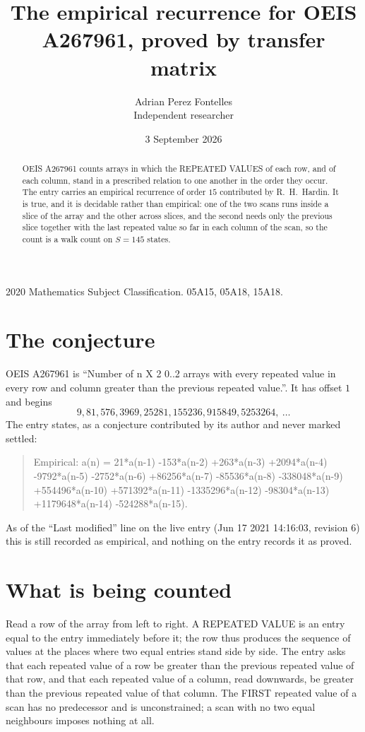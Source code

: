 \documentclass[11pt,a4paper]{article}
\title{The empirical recurrence for OEIS A267961, proved by transfer matrix}
\author{Adrian Perez Fontelles\\ \small Independent researcher}
\date{3 September 2026}
\theoremstyle{plain}
\theoremstyle{definition}
\begin{document}
\maketitle

\begin{abstract}
OEIS A267961 counts arrays in which the REPEATED VALUES of each row, and of each column, stand in a
prescribed relation to one another in the order they occur. The entry carries an empirical
recurrence of order $15$ contributed by R.~H.~Hardin. It is true, and it is decidable
rather than empirical: one of the two scans runs inside a slice of the array and the other
across slices, and the second needs only the previous slice together with the last repeated
value so far in each column of the scan, so the count is a walk count on $S=145$ states.
\end{abstract}

\noindent\small 2020 Mathematics Subject Classification. 05A15, 05A18, 15A18.\normalsize

\section{The conjecture}

OEIS A267961 is ``Number of n X 2 0..2 arrays with every repeated value in every row and column greater than the previous repeated value.''. It has offset $1$ and begins
\[
9, 81, 576, 3969, 25281, 155236, 915849, 5253264,\ \dots
\]
The entry states, as a conjecture contributed by its author and never marked settled:
\begin{quote}
Empirical: a(n) = 21*a(n-1) -153*a(n-2) +263*a(n-3) +2094*a(n-4) -9792*a(n-5) -2752*a(n-6) +86256*a(n-7) -85536*a(n-8) -338048*a(n-9) +554496*a(n-10) +571392*a(n-11) -1335296*a(n-12) -98304*a(n-13) +1179648*a(n-14) -524288*a(n-15).
\end{quote}
As of the ``Last modified'' line on the live entry (Jun 17 2021 14:16:03, revision 6) this is still
recorded as empirical, and nothing on the entry records it as proved.

\section{What is being counted}

Read a row of the array from left to right. A REPEATED VALUE is an entry equal to the entry
immediately before it; the row thus produces the sequence of values at the places where two
equal entries stand side by side. The entry asks that each repeated value of a row be
greater than the previous repeated value of that row, and that each repeated value of a column,
read downwards, be greater than the previous repeated value of that column. The FIRST repeated
value of a scan has no predecessor and is unconstrained; a scan with no two equal neighbours
imposes nothing at all.
\end{document}
